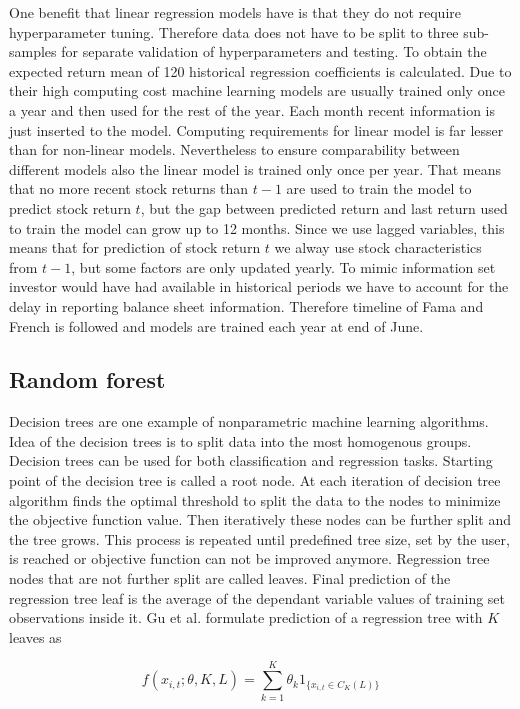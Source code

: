 \documentclass{article}
\begin{document}
One benefit that linear regression models have is that they do not require hyperparameter tuning. Therefore data  does not have to be split to three sub-samples for separate validation of hyperparameters and testing. To obtain the expected return mean of 120 historical regression coefficients is calculated. Due to their high computing cost machine learning models are usually trained only once a year and then used for the rest of the year. Each month recent information is just inserted to the model. Computing requirements for linear model is far lesser than for non-linear models. Nevertheless to ensure comparability between different models also the linear model is trained only once per year. That means that no more recent stock returns than $t-1$ are used to train the model to predict stock return $t$, but the gap between predicted return and last return used to train the model can grow up to 12 months. Since we use lagged variables, this means that for prediction of stock return $t$ we alway use stock characteristics from $t-1$, but some factors are only updated yearly. To mimic information set investor would have had available in historical periods we have to account for the delay in reporting balance sheet information. Therefore timeline of Fama and French \citeyear{FAMA19933} is followed and models are trained each year at end of June. 

\subsection{Random forest}
Decision trees are one example of nonparametric machine learning algorithms. Idea of the decision trees is to split data into the most homogenous groups. Decision trees can be used for both classification and regression tasks. Starting point of the decision tree is called a root node. At each iteration of decision tree algorithm finds the optimal threshold to split the data to the nodes to minimize the objective function value. %
Then iteratively these nodes can be further split and the tree grows. This process is repeated until predefined tree size, set by the user, is reached or objective function can not be improved anymore. Regression tree nodes that are not further split are called leaves. Final prediction of the regression tree leaf is the average of the dependant variable values of training set observations inside it. Gu et al. \citeyear{guetal} formulate prediction of a regression tree with $K$ leaves as 

\begin{equation}
f(x_{i, t}; \theta, K, L) = \sum_{k=1}^K \theta_k 1 _{\{x_{i, t} \in C_K(L)\}}
\end{equation}
\end{document}
